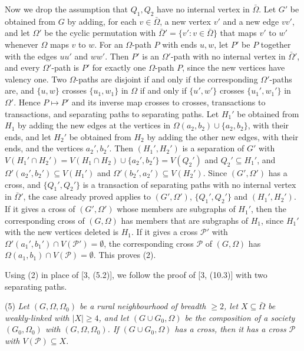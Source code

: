 {Now we drop the assumption that $Q_1, Q_2$ have no internal vertex in $\bar{\Omega}$. Let $G'$ be obtained from $G$ by adding, for each $v \in \bar{\Omega}$, a new vertex $v'$ and a new edge $vv'$, and let $\Omega'$ be the cyclic permutation with $\bar{\Omega}' = \{v' : v \in \bar{\Omega}\}$ that maps $v'$ to $w'$ whenever $\Omega$ maps $v$ to $w$. For an $\Omega$-path $P$ with ends $u, w$, let $P'$ be $P$ together with the edges $uu'$ and $ww'$. Then $P'$ is an $\Omega'$-path with no internal vertex in $\bar{\Omega}'$, and every $\Omega'$-path is $P'$ for exactly one $\Omega$-path $P$, since the new vertices have valency one. Two $\Omega$-paths are disjoint if and only if the corresponding $\Omega'$-paths are, and $\{u, w\}$ crosses $\{u_1, w_1\}$ in $\Omega$ if and only if $\{u', w'\}$ crosses $\{u_1', w_1'\}$ in $\Omega'$. Hence $P \mapsto P'$ and its inverse map crosses to crosses, transactions to transactions, and separating paths to separating paths. Let $H_1'$ be obtained from $H_1$ by adding the new edges at the vertices in $\Omega(a_2, b_2) \cup \{a_2, b_2\}$, with their ends, and let $H_2'$ be obtained from $H_2$ by adding the other new edges, with their ends, and the vertices $a_2', b_2'$. Then $(H_1', H_2')$ is a separation of $G'$ with $V(H_1' \cap H_2') = V(H_1 \cap H_2) \cup \{a_2', b_2'\} = V(Q_2')$ and $Q_2' \subseteq H_1'$, and $\Omega'(a_2', b_2') \subseteq V(H_1')$ and $\Omega'(b_2', a_2') \subseteq V(H_2')$. Since $(G', \Omega')$ has a cross, and $\{Q_1', Q_2'\}$ is a transaction of separating paths with no internal vertex in $\bar{\Omega}'$, the case already proved applies to $(G', \Omega')$, $\{Q_1', Q_2'\}$ and $(H_1', H_2')$. If it gives a cross of $(G', \Omega')$ whose members are subgraphs of $H_1'$, then the corresponding cross of $(G, \Omega)$ has members that are subgraphs of $H_1$, since $H_1'$ with the new vertices deleted is $H_1$. If it gives a cross $\mathscr{P}'$ with $\Omega'(a_1', b_1') \cap V(\mathscr{P}') = \emptyset$, the corresponding cross $\mathscr{P}$ of $(G, \Omega)$ has $\Omega(a_1, b_1) \cap V(\mathscr{P}) = \emptyset$. This proves (2).

Using (2) in place of [3, (5.2)], we follow the proof of [3, (10.3)] with two separating paths.

\hspace*{12pt}(5) \textit{Let $(G, \Omega, \Omega_0)$ be a rural neighbourhood of breadth $\ge 2$, let $X \subseteq \bar{\Omega}$ be weakly-linked with $|X| \ge 4$, and let $(G \cup G_0, \Omega)$ be the composition of a society $(G_0, \Omega_0)$ with $(G, \Omega, \Omega_0)$. If $(G \cup G_0, \Omega)$ has a cross, then it has a cross $\mathscr{P}$ with $V(\mathscr{P}) \subseteq X$.}

}
